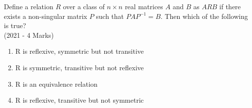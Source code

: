     \item{
        
            Define a relation $R$ over a class of $n \times n$ real matrices $A$ and $B$ as $A R B$ if  there exists a non-singular matrix $P$ such that $PAP^{-1} = B$. Then which of the following is true?\\ \text{ }
             \hfill
              {(2021 - 4 Marks)}
	              	\begin{enumerate}
	              		\item R is reflexive, symmetric but not transitive
	              		\item R is symmetric, transitive but not reflexive
	              		\item R is an equivalence relation
	              		\item R is reflexive, transitive but not symmetric
	              	\end{enumerate}
        
        }



